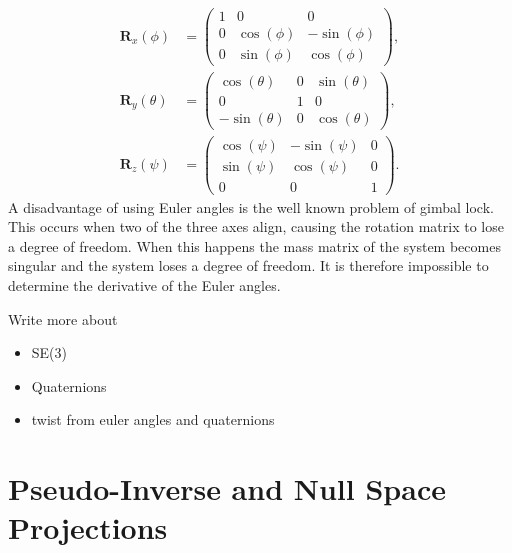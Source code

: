 \begin{subequations}
\begin{align}
    \bm{R}_x(\phi) &= \begin{pmatrix}
        1 & 0 & 0 \\
        0 & \cos(\phi) & -\sin(\phi) \\
        0 & \sin(\phi) & \cos(\phi)
    \end{pmatrix}, \\
    \bm{R}_y(\theta) &= \begin{pmatrix}
        \cos(\theta) & 0 & \sin(\theta) \\
        0 & 1 & 0 \\
        -\sin(\theta) & 0 & \cos(\theta)
    \end{pmatrix}, \\
    \bm{R}_z(\psi) &= \begin{pmatrix}
        \cos(\psi) & -\sin(\psi) & 0 \\
        \sin(\psi) & \cos(\psi) & 0 \\
        0 & 0 & 1
    \end{pmatrix}.
\end{align}
\end{subequations}
A disadvantage of using Euler angles is the well known problem of gimbal lock.
This occurs when two of the three axes align, causing the rotation matrix to lose
a degree of freedom. When this happens the mass matrix of the system becomes singular
and the system loses a degree of freedom. It is therefore impossible to determine
the derivative of the Euler angles.

{\color{red}
Write more about
\begin{itemize}
    \item SE(3)
    \item Quaternions
    \item twist from euler angles and quaternions
\end{itemize}
}

\section{Pseudo-Inverse and Null Space Projections}
\label{sec:pseudoinverse}

